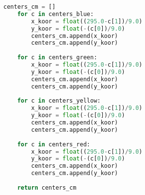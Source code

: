 \begin{lstlisting}[language=Python]
    centers_cm = []
    for c in centers_blue:
        x_koor = float((295.0-c[1])/9.0)
        y_koor = float(-(c[0])/9.0)
        centers_cm.append(x_koor)
        centers_cm.append(y_koor)
        
    for c in centers_green:
        x_koor = float((295.0-c[1])/9.0)
        y_koor = float(-(c[0])/9.0)
        centers_cm.append(x_koor)
        centers_cm.append(y_koor)
        
    for c in centers_yellow:
        x_koor = float((295.0-c[1])/9.0)
        y_koor = float(-(c[0])/9.0)
        centers_cm.append(x_koor)
        centers_cm.append(y_koor)
    
    for c in centers_red:
        x_koor = float((295.0-c[1])/9.0)
        y_koor = float(-(c[0])/9.0)
        centers_cm.append(x_koor)
        centers_cm.append(y_koor)
                          
    return centers_cm
\end{lstlisting}
